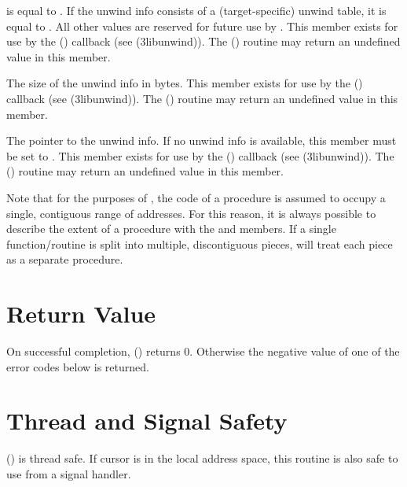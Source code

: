 \documentclass{article}
\begin{document}
\begin{description}
   is equal to .  If the
  unwind info consists of a (target-specific) unwind table, it is
  equal to .  All other values are
  reserved for future use by .  This member exists
  for use by the () callback (see
  (3libunwind)).  The
  () routine
  may return an undefined value in this member. \\
\item[\Type{int} \Var{unwind\_info\_size}] The size of the unwind info
  in bytes.  This member exists for use by the
  () callback (see
  (3libunwind)).  The
  () routine
  may return an undefined value in this member.\\
\item[\Type{void~*}\Var{unwind\_info}] The pointer to the unwind info.
  If no unwind info is available, this member must be set to
  .  This member exists for use by the
  () callback (see
  (3libunwind)).  The
  () routine
  may return an undefined value in this member.\\
\end{description}
Note that for the purposes of , the code of a
procedure is assumed to occupy a single, contiguous range of
addresses.  For this reason, it is always possible to describe the
extent of a procedure with the  and 
members.  If a single function/routine is split into multiple,
discontiguous pieces,  will treat each piece as a
separate procedure.

\section{Return Value}

On successful completion, () returns 0.
Otherwise the negative value of one of the error codes below is
returned.

\section{Thread and Signal Safety}

() is thread safe.  If cursor  is
in the local address space, this routine is also safe to use from a
signal handler.
\end{document}
